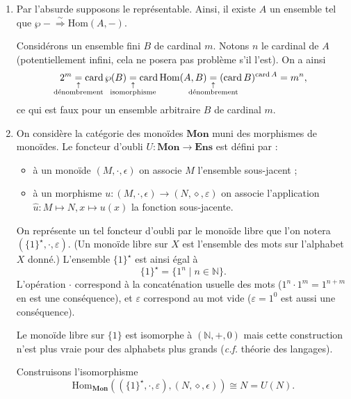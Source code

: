 \documentclass{../../td}
\begin{document}
  \begin{enumerate}
    \item Par l'absurde supposons le représentable.
      Ainsi, il existe $A$ un ensemble tel que $\wp- \overset\sim\Rightarrow \mathrm{Hom}(A, -)$.

      Considérons un ensemble fini $B$ de cardinal $m$.
      Notons $n$ le cardinal de $A$ (potentiellement infini, cela ne posera pas problème s'il l'est).
      On a ainsi \[
        2^m\underset {\substack{\uparrow\\\mathclap{\text{dénombrement}}}} =\operatorname{card} \wp(B) \underset {\substack{\uparrow\\\mathclap{\text{isomorphisme}}}} = \operatorname{card} \mathrm{Hom}(A, B) \underset {\substack{\uparrow\\\mathclap{\text{dénombrement}}}}= (\operatorname{card} B)^{\operatorname{card} A} = m^n
      ,\]
      ce qui est faux pour un ensemble arbitraire $B$ de cardinal $m$.
    \item On considère la catégorie des monoïdes $\mathbf{Mon}$ muni des morphismes de monoïdes.
      Le foncteur d'oubli $U : \mathbf{Mon} \to \mathbf{Ens}$ est défini par :
      \begin{itemize}
        \item à un monoïde $(M, \cdot, \epsilon)$ on associe $M$ l'ensemble sous-jacent ;
        \item à un morphisme $u : (M, \cdot, \epsilon) \to (N, \diamond, \varepsilon)$ on associe l'application $\hat{u} : M \mapsto N, x \mapsto u(x)$ la fonction sous-jacente.
      \end{itemize}

      On représente un tel foncteur d'oubli par le monoïde libre que l'on notera $(\{1\}^\star, \cdot, \varepsilon)$. (Un monoïde libre sur $X$ est l'ensemble des mots sur l'alphabet $X$ donné.)
      L'ensemble $\{1\}^\star$ est ainsi égal à \[
      \{1\}^\star = \{1^n  \mid n \in \mathds{N}\}
      .\] 
      L'opération $\cdot$ correspond à la concaténation usuelle des mots ($1^n \cdot 1^m = 1^{n+m}$ en est une conséquence), et $\varepsilon$ correspond au mot vide ($\varepsilon = 1^0$ est aussi une conséquence).

      Le monoïde libre sur $\{1\}$ est isomorphe à $(\mathds{N}, +, 0)$ mais cette construction n'est plus vraie pour des alphabets plus grands (\textit{c.f.} théorie des langages).

      Construisons l'isomorphisme \[
      \mathrm{Hom}_{\mathbf{Mon}}((\{1\}^\star, \cdot, \varepsilon), (N, \diamond, \epsilon)) \cong N = U(N)
      .\]


\end{enumerate}
\end{document}
